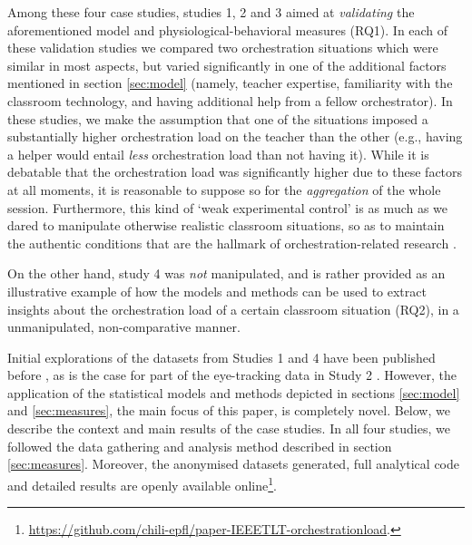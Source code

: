 \documentclass[10pt,journal,compsoc]{IEEEtran}
\begin{document}
Among these four case studies, studies 1, 2 and 3 aimed at \textit{validating} the aforementioned model and physiological-behavioral measures (RQ1). In each of these validation studies we compared two orchestration situations which were similar in most aspects, but varied significantly in one of the additional factors mentioned in section \ref{sec:model} (namely, teacher expertise, familiarity with the classroom technology, and having additional help from a fellow orchestrator). In these studies, we make the assumption that one of the situations imposed a substantially higher orchestration load on the teacher than the other (e.g., having a helper would entail \textit{less} orchestration load than not having it). While it is debatable that the orchestration load was significantly higher  due to these factors at all moments, it is reasonable to suppose so for the \textit{aggregation} of the whole session. Furthermore, this kind of `weak experimental control' is as much as we dared to manipulate otherwise realistic classroom situations, so as to maintain the authentic conditions that are the hallmark of orchestration-related research \cite{Roschelle2013}.

On the other hand, study 4 was \textit{not} manipulated, and is rather provided as an illustrative example of how the models and methods can be used to extract insights about the orchestration load of a certain classroom situation (RQ2), in a unmanipulated, non-comparative manner.

Initial explorations of the datasets from Studies 1 and 4 have been published before \cite{Prieto2015cscl}, as is the case for part of the eye-tracking data in Study 2 \cite{Prieto2015ectel}. However, the application of the statistical models and methods depicted in sections \ref{sec:model} and \ref{sec:measures}, the main focus of this paper, is completely novel. Below, we describe the context and main results of the case studies. In all four studies, we followed the data gathering and analysis method described in section \ref{sec:measures}. Moreover, the anonymised datasets generated, full analytical code and detailed results are openly available online\footnote{\href{https://github.com/chili-epfl/paper-IEEETLT-orchestrationload}{https://github.com/chili-epfl/paper-IEEETLT-orchestrationload}.}.
\end{document}
